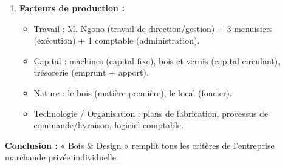 \documentclass[11pt]{article}
\newcommand{\cle}[1]{{\popxbold\color{popdark}#1}}
\begin{document}
\begin{exoresolu}
\begin{enumerate}
        \item \textbf{Facteurs de production :}
              \begin{itemize}
                  \item \cle{Travail} : M. Ngono (travail de direction/gestion) + 3 menuisiers (exécution) + 1 comptable (administration).
                  \item \cle{Capital} : machines (capital fixe), bois et vernis (capital circulant), trésorerie (emprunt + apport).
                  \item \cle{Nature} : le bois (matière première), le local (foncier).
                  \item \cle{Technologie / Organisation} : plans de fabrication, processus de commande/livraison, logiciel comptable.
              \end{itemize}
    \end{enumerate}
    \textbf{Conclusion :} « Bois \& Design » remplit tous les critères de l'entreprise marchande privée individuelle.
\end{exoresolu}
\end{document}

